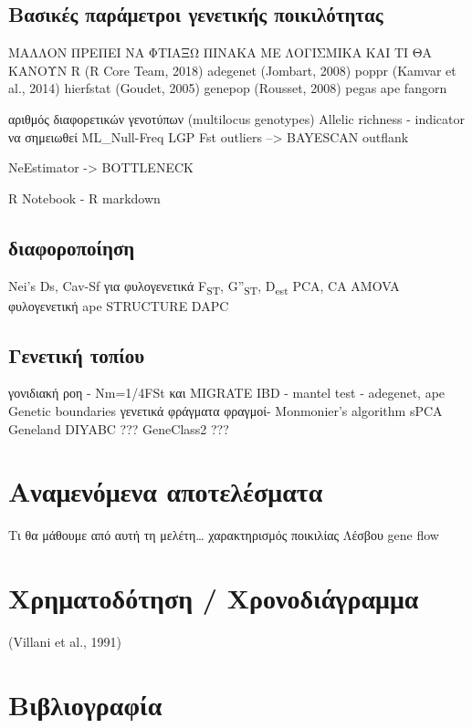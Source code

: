 \documentclass[12pt,a4paper,]{report}
\begin{document}
\hypertarget{---}{%
\subsection{Βασικές παράμετροι γενετικής ποικιλότητας}\label{---}}

ΜΑΛΛΟΝ ΠΡΕΠΕΙ ΝΑ ΦΤΙΑΞΩ ΠΙΝΑΚΑ ΜΕ ΛΟΓΙΣΜΙΚΑ ΚΑΙ ΤΙ ΘΑ ΚΑΝΟΥΝ R (R Core
Team, 2018) adegenet (Jombart, 2008) poppr (Kamvar et al., 2014)
hierfstat (Goudet, 2005) genepop (Rousset, 2008) pegas ape fangorn

αριθμός διαφορετικών γενοτύπων (multilocus genotypes) Allelic richness -
indicator να σημειωθεί ML\_Null-Freq LGP Fst outliers --\textgreater{}
BAYESCAN outflank

NeEstimator -\textgreater{} BOTTLENECK

R Notebook - R markdown

\subsection{διαφοροποίηση}

Nei's Ds, Cav-Sf για φυλογενετικά F\textsubscript{ST},
G''\textsubscript{ST}, D\textsubscript{est} PCA, CA AMOVA φυλογενετική
ape STRUCTURE DAPC

\hypertarget{-}{%
\subsection{Γενετική τοπίου}\label{-}}

γονιδιακή ροη - Nm=1/4FSt και MIGRATE IBD - mantel test - adegenet, ape
Genetic boundaries γενετικά φράγματα φραγμοί- Monmonier's algorithm sPCA
Geneland DIYABC ??? GeneClass2 ???

\hypertarget{-}{%
\section{Αναμενόμενα αποτελέσματα}\label{-}}

Τι θα μάθουμε από αυτή τη μελέτη\ldots{} χαρακτηρισμός ποικιλίας Λέσβου
gene flow

\hypertarget{-}{%
\section{Χρηματοδότηση / Χρονοδιάγραμμα}\label{-}}

(Villani et al., 1991)

\section{Βιβλιογραφία}
\end{document}
